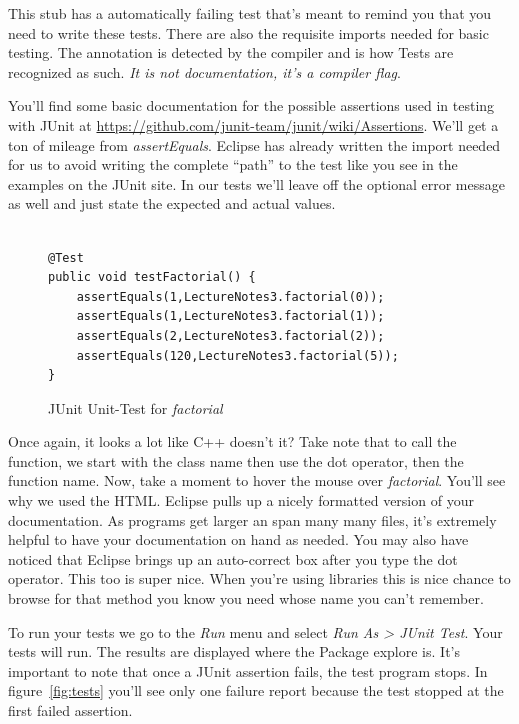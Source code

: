 \documentclass[]{tufte-handout}
\begin{document}
This stub has a automatically failing test that's meant to remind you that you need to write these tests. There are also the requisite imports needed for basic testing. The \@Test annotation is detected by the compiler and is how Tests are recognized as such. \textit{It is not documentation, it's a compiler flag}.


You'll find some basic documentation for the possible assertions used in testing with JUnit at \url{https://github.com/junit-team/junit/wiki/Assertions}. We'll get a ton of mileage from \textit{assertEquals}. Eclipse has already written the import needed for us to avoid writing the complete ``path'' to the test like you see in the examples on the JUnit site. In our tests we'll leave off the optional error message as well and just state the expected and actual values.

\begin{figure}
\begin{lstlisting}

@Test
public void testFactorial() {
	assertEquals(1,LectureNotes3.factorial(0));
	assertEquals(1,LectureNotes3.factorial(1));
	assertEquals(2,LectureNotes3.factorial(2));
	assertEquals(120,LectureNotes3.factorial(5));
}

\end{lstlisting}
\label{fig:factTests}
\caption{JUnit Unit-Test for \textit{factorial}}
\end{figure}

Once again, it looks a lot like C++ doesn't it? Take note that to call the function, we start with the class name then use the dot operator, then the function name. Now, take a moment to hover the mouse over \textit{factorial}. You'll see why we used the HTML\@. Eclipse pulls up a nicely formatted version of your documentation. As programs get larger an span many many files, it's extremely helpful to have your documentation on hand as needed. You may also have noticed that Eclipse brings up an auto-correct box after you type the dot operator. This too is super nice. When you're using libraries this is nice chance to browse for that method you know you need whose name you can't remember.

To run your tests we go to the \textit{Run} menu and select \textit{Run As > JUnit Test}. Your tests will run. 	The results are displayed where the Package explore is. It's important to note that once a JUnit assertion fails, the test program stops.  In figure~\ref{fig:tests} you'll see only one failure report because the test stopped at the first failed assertion.
\end{document}
